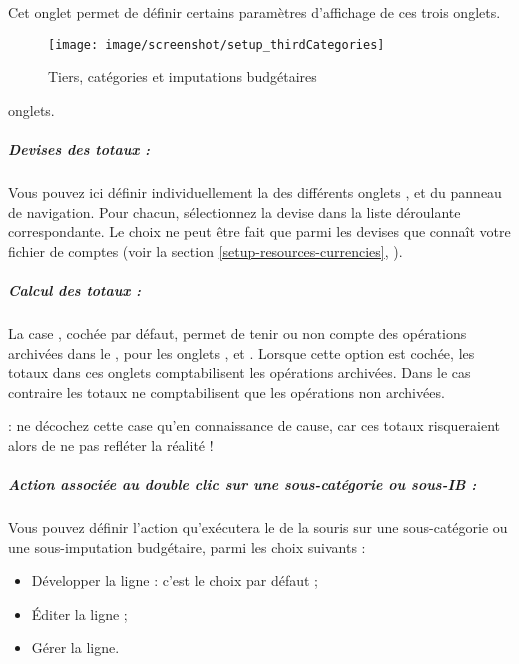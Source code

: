 Cet onglet permet de définir certains paramètres d'affichage de ces trois \ifIllustration onglets.
\begin{figure}[h!]
\begin{center}
\texttt{[image: image/screenshot/setup\_thirdCategories]}
\end{center}
\caption{Tiers, catégories et imputations budgétaires}
\label{setup-thirdCategories-img}
\end{figure}
\else onglets.
\fi


\subparagraph{Devises des totaux :\label{setup-display-third-currencies}}

Vous pouvez ici définir individuellement la  des différents onglets ,  et  du panneau de navigation. Pour chacun, sélectionnez la devise dans la liste déroulante correspondante. Le choix ne peut être fait que parmi les devises que connaît votre fichier de comptes (voir la section \vref{setup-resources-currencies}, ).


\subparagraph{Calcul des totaux :\label{setup-display-third-sum}}

La case , cochée par défaut, permet de tenir ou non compte des opérations archivées dans le , pour les onglets ,  et . Lorsque cette option est cochée, les totaux dans ces onglets comptabilisent les opérations archivées. Dans le cas contraire les totaux ne comptabilisent que les opérations non archivées.

 : ne décochez cette case qu'en connaissance de cause, car ces totaux risqueraient alors de ne pas refléter la réalité !


\subparagraph{Action associée au double clic sur une sous-catégorie ou sous-IB :\label{setup-display-third-mouse}}

Vous pouvez définir l'action qu'exécutera le  de la souris sur une sous-catégorie ou une sous-imputation budgétaire, parmi les choix suivants :
\begin{itemize}
	\item Développer la ligne : c'est le choix par défaut ;
	\item Éditer la ligne ;
	\item Gérer la ligne.
\end{itemize}

